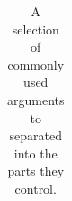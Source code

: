 \documentclass[article,shortnames]{jss}
\newcommand{\hl}[1]{\textcolor{magenta}{#1}}
\begin{document}
\begin{table}
\begin{tabular}{p{0.25\linewidth}p{0.45\linewidth}p{0.2\linewidth}}
\hline
\end{tabular}
\caption{A selection of commonly used arguments to  separated into the parts they control.}
\label{table.cleanFormals}
\end{table}



\begin{figure}[tb]

\end{figure}
\end{document}

